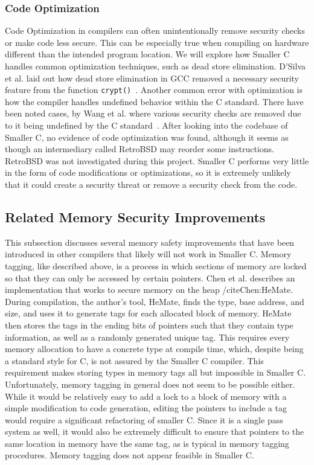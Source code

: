 \documentclass[sigconf, anonymous]{acmart}
\newcommand{\code}[1]{\texttt{#1}}
\begin{document}
\subsubsection{Code Optimization}

Code Optimization in compilers can often unintentionally remove security checks or make code less secure. This can be especially true when compiling on hardware different than the intended program location. We will explore how Smaller C handles common optimization techniques, such as dead store elimination. D’Silva et al. laid out how dead store elimination in GCC removed a necessary security feature from the function \code{crypt()}~\cite{DSilva:Correctness}. Another common error with optimization is how the compiler handles undefined behavior within the C standard. There have been noted cases, by Wang et al. where various security checks are removed due to it being undefined by the C standard~\cite{Wang:Optimization}. After looking into the codebase of Smaller C, no evidence of code optimization was found, although it seems as though an intermediary called RetroBSD may reorder some instructions. RetroBSD was not investigated during this project. Smaller C performs very little in the form of code modifications or optimizations, so it is extremely unlikely that it could create a security threat or remove a security check from the code.

\subsection{Related Memory Security Improvements}

This subsection discusses several memory safety improvements that have been introduced in other compilers that likely will not work in Smaller C.
Memory tagging, like described above, is a process in which sections of memory are locked so that they can only be accessed by certain pointers. Chen et al. describes an implementation that works to secure memory on the heap /cite{Chen:HeMate}. During compilation, the author's tool, HeMate, finds the type, base address, and size, and uses it to generate tags for each allocated block of memory. HeMate then stores the tags in the ending bits of pointers such that they contain type information, as well as a randomly generated unique tag. This requires every memory allocation to have a concrete type at compile time, which, despite being a standard style for C, is not assured by the Smaller C compiler. This requirement makes storing types in memory tags all but impossible in Smaller C. Unfortunately, memory tagging in general does not seem to be possible either. While it would be relatively easy to add a lock to a block of memory with a simple modification to code generation, editing the pointers to include a tag would require a significant refactoring of smaller C. Since it is a single pass system as well, it would also be extremely difficult to ensure that pointers to the same location in memory have the same tag, as is typical in memory tagging procedures. Memory tagging does not appear feasible in Smaller C. 
\end{document}
